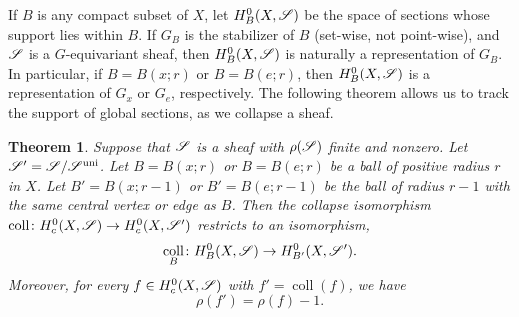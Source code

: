 \documentclass[letter]{amsart}
\newtheorem{thm}{Theorem}[section]
\theoremstyle{definition}
\theoremstyle{remark}
\numberwithin{thm}{section}
\numberwithin{equation}{section}
\DeclareMathOperator{\uni}{uni}
\DeclareMathOperator{\coll}{coll}
\begin{document}
If $B$ is any compact subset of $X$, let $H_B^0(X, {\mathscr{S}})$ be the space of sections whose support lies within $B$.  If $G_B$ is the stabilizer of $B$ (set-wise, not point-wise), and ${\mathscr{S}}$ is a $G$-equivariant sheaf, then $H_B^0(X, {\mathscr{S}})$ is naturally a representation of $G_B$.  In particular, if $B = B(x;r)$ or $B = B(e;r)$, then $H_B^0(X, {\mathscr{S}})$ is a representation of $G_x$ or $G_e$, respectively.  The following theorem allows us to track the support of global sections, as we collapse a sheaf.
\begin{thm}
\label{track-support}
Suppose that ${\mathscr{S}}$ is a sheaf with $\rho({\mathscr{S}})$ finite and nonzero.  Let $\sheaf{S}' = \sheaf{S} / \sheaf{S}^{\uni}$.  Let $B = B(x;r)$ or $B = B(e;r)$ be a ball of positive radius $r$ in $X$.  Let $B' = B(x;r-1)$ or $B' = B(e;r-1)$ be the ball of radius $r-1$ with the same central vertex or edge as $B$.  Then the collapse isomorphism $\coll \From H_c^0(X, \sheaf{S}) \To H_c^0(X, \sheaf{S}')$ restricts to an isomorphism,
$$\coll_B \From H_B^0(X, \sheaf{S}) \To H_{B'}^0(X, \sheaf{S}').$$
Moreover, for every $f \in H_c^0(X, {\mathscr{S}})$ with $f' = \coll(f)$, we have
$$\rho(f') = \rho(f) - 1.$$
\end{thm}
\end{document}
